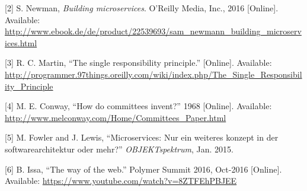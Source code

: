 \documentclass[]{assets/latex/ieee}
\begin{document}
\hypertarget{ref-Newman2015}{}
{[}2{]} S. Newman, \emph{Building microservices}. O'Reilly Media, Inc.,
2016 {[}Online{]}. Available:
\url{http://www.ebook.de/de/product/22539693/sam_newmann_building_microservices.html}

\hypertarget{ref-Martin}{}
{[}3{]} R. C. Martin, ``The single responsibility principle.''
{[}Online{]}. Available:
\url{http://programmer.97things.oreilly.com/wiki/index.php/The_Single_Responsibility_Principle}

\hypertarget{ref-Conway1968}{}
{[}4{]} M. E. Conway, ``How do committees invent?'' 1968 {[}Online{]}.
Available: \url{http://www.melconway.com/Home/Committees_Paper.html}

\hypertarget{ref-Fowler2015}{}
{[}5{]} M. Fowler and J. Lewis, ``Microservices: Nur ein weiteres
konzept in der softwarearchitektur oder mehr?'' \emph{OBJEKTspektrum},
Jan. 2015.

\hypertarget{ref-Issa2016}{}
{[}6{]} B. Issa, ``The way of the web.'' Polymer Summit 2016, Oct-2016
{[}Online{]}. Available:
\url{https://www.youtube.com/watch?v=8ZTFEhPBJEE}
\end{document}

